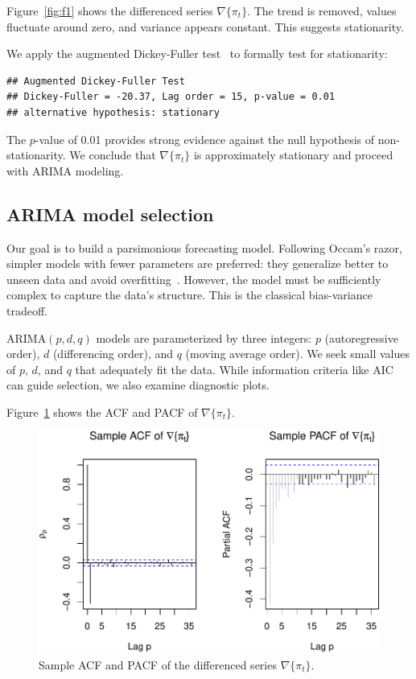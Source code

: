 \documentclass[final,11pt]{article}
\theoremstyle{plain}
\theoremstyle{remark}
\begin{document}
Figure~\ref{fig:f1} shows the differenced series $\nabla\{\pi_t\}$. The
trend is removed, values fluctuate around zero, and variance appears
constant. This suggests stationarity.

We apply the augmented Dickey-Fuller test~\cite{noauthor_dickeyfuller_2021}
to formally test for stationarity:

\begin{verbatim}
## Augmented Dickey-Fuller Test
## Dickey-Fuller = -20.37, Lag order = 15, p-value = 0.01
## alternative hypothesis: stationary
\end{verbatim}

The $p$-value of 0.01 provides strong evidence against the null hypothesis
of non-stationarity. We conclude that $\nabla\{\pi_t\}$ is approximately
stationary and proceed with ARIMA modeling.

\hypertarget{arima-model-selection}{%
\subsection{ARIMA model selection}\label{arima-model-selection}}

Our goal is to build a parsimonious forecasting model. Following Occam's
razor, simpler models with fewer parameters are preferred: they generalize
better to unseen data and avoid overfitting~\cite{bias_variance}. However,
the model must be sufficiently complex to capture the data's structure.
This is the classical bias-variance tradeoff.

ARIMA$(p,d,q)$ models are parameterized by three integers: $p$
(autoregressive order), $d$ (differencing order), and $q$ (moving average
order). We seek small values of $p$, $d$, and $q$ that adequately fit the
data. While information criteria like AIC can guide selection, we also
examine diagnostic plots.

Figure~\ref{fig:f3} shows the ACF and PACF of $\nabla\{\pi_t\}$.

\begin{figure}
\includegraphics{paper_files/figure-latex/unnamed-chunk-6-1.pdf}
\caption{Sample ACF and PACF of the differenced series $\nabla \{\pi_t\}$.}
\label{fig:f3}
\end{figure}
\end{document}
